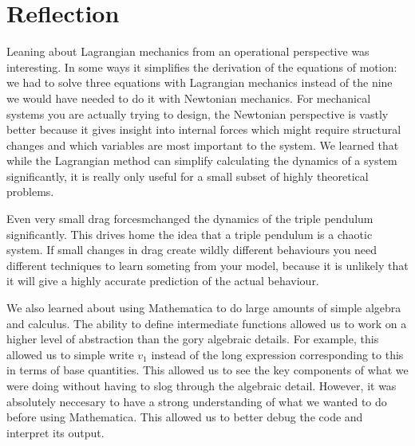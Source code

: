\section{Reflection}
Leaning about Lagrangian mechanics from an operational perspective was interesting. In some ways it simplifies the derivation of the equations of motion: we had to solve three equations with Lagrangian mechanics instead of the nine we would have needed to do it with Newtonian mechanics. For mechanical systems you are actually trying to design, the Newtonian perspective is vastly better because it gives insight into internal forces which might require structural changes and which variables are most important to the system. We learned that while the Lagrangian method can simplify calculating the dynamics of a system significantly, it is really only useful for a small subset of highly theoretical problems.

Even very small drag forcesmchanged the dynamics of the triple pendulum significantly. This drives home the idea that a triple pendulum is a chaotic system. If small changes in drag create wildly different behaviours you need different techniques to learn someting from your model, because it is unlikely that it will give a highly accurate prediction of the actual behaviour.

We also learned about using Mathematica to do large amounts of simple algebra and calculus. The ability to define intermediate functions allowed us to work on a higher level of abstraction than the gory algebraic details. For example, this allowed us to simple write $v_1$ instead of the long expression corresponding to this in terms of base quantities. This allowed us to see the key components of what we were doing without having to slog through the algebraic detail. However, it was absolutely neccesary to have a strong understanding of what we wanted to do before using Mathematica. This allowed us to better debug the code and interpret its output.
